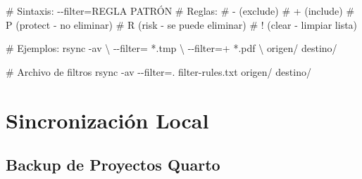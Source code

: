 \documentclass[
  doc,
  floatsintext,
  longtable,
  a4paper,
  nolmodern,
  notxfonts,
  notimes,
  12pt,
  colorlinks=true,linkcolor=blue,citecolor=blue,urlcolor=blue]{apa7}
\newenvironment{Shaded}{\begin{snugshade}}{\end{snugshade}}
\newcommand{\AttributeTok}[1]{\textcolor[rgb]{0.40,0.45,0.13}{#1}}
\newcommand{\CommentTok}[1]{\textcolor[rgb]{0.37,0.37,0.37}{#1}}
\newcommand{\DataTypeTok}[1]{\textcolor[rgb]{0.68,0.00,0.00}{#1}}
\newcommand{\FunctionTok}[1]{\textcolor[rgb]{0.28,0.35,0.67}{#1}}
\newcommand{\NormalTok}[1]{\textcolor[rgb]{0.00,0.23,0.31}{#1}}
\newcommand{\OperatorTok}[1]{\textcolor[rgb]{0.37,0.37,0.37}{#1}}
\newcommand{\StringTok}[1]{\textcolor[rgb]{0.13,0.47,0.30}{#1}}
\begin{document}
\begin{Shaded}
\begin{Highlighting}[]
\CommentTok{\# Sintaxis: {-}{-}filter=\textquotesingle{}REGLA PATRÓN\textquotesingle{}}
\CommentTok{\# Reglas:}
\CommentTok{\#   {-}  (exclude)}
\CommentTok{\#   +  (include)}
\CommentTok{\#   P  (protect {-} no eliminar)}
\CommentTok{\#   R  (risk {-} se puede eliminar)}
\CommentTok{\#   !  (clear {-} limpiar lista)}

\CommentTok{\# Ejemplos:}
\FunctionTok{rsync} \AttributeTok{{-}av} \DataTypeTok{\textbackslash{}}
  \AttributeTok{{-}{-}filter}\OperatorTok{=}\StringTok{\textquotesingle{}{-} *.tmp\textquotesingle{}} \DataTypeTok{\textbackslash{}}
  \AttributeTok{{-}{-}filter}\OperatorTok{=}\StringTok{\textquotesingle{}+ *.pdf\textquotesingle{}} \DataTypeTok{\textbackslash{}}
\NormalTok{  origen/ destino/}

\CommentTok{\# Archivo de filtros}
\FunctionTok{rsync} \AttributeTok{{-}av} \AttributeTok{{-}{-}filter}\OperatorTok{=}\StringTok{\textquotesingle{}. filter{-}rules.txt\textquotesingle{}}\NormalTok{ origen/ destino/}
\end{Highlighting}
\end{Shaded}

\section{Sincronización Local}\label{sincronizaciuxf3n-local}

\subsection{Backup de Proyectos
Quarto}\label{backup-de-proyectos-quarto}
\end{document}
